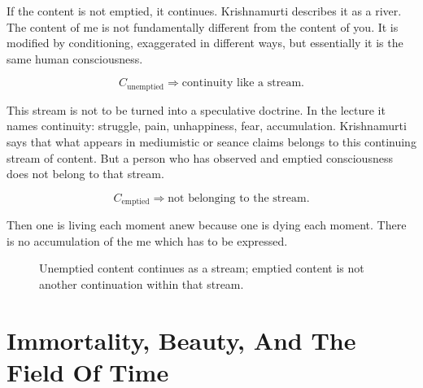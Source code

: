 If the content is not emptied, it continues. Krishnamurti describes it as a river. The content of me is not fundamentally different from the content of you. It is modified by conditioning, exaggerated in different ways, but essentially it is the same human consciousness.

\begin{equation}
C_{\text{unemptied}}
\Rightarrow
\text{continuity like a stream}.
\end{equation}

This stream is not to be turned into a speculative doctrine. In the lecture it names continuity: struggle, pain, unhappiness, fear, accumulation. Krishnamurti says that what appears in mediumistic or seance claims belongs to this continuing stream of content. But a person who has observed and emptied consciousness does not belong to that stream.

\begin{equation}
C_{\text{emptied}}
\Rightarrow
\text{not belonging to the stream}.
\end{equation}

Then one is living each moment anew because one is dying each moment. There is no accumulation of the me which has to be expressed.

\begin{figure}
\centering
{}
\caption{Unemptied content continues as a stream; emptied content is not another continuation within that stream.}
\end{figure}

\section{Immortality, Beauty, And The Field Of Time}

